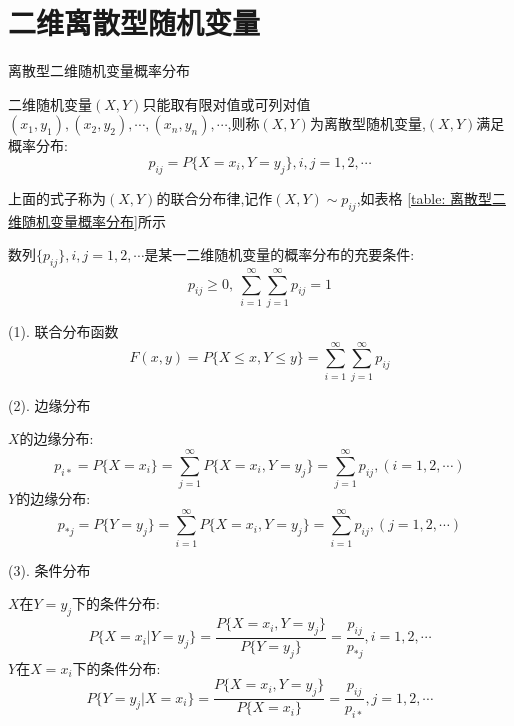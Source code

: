 \section{二维离散型随机变量}
\begin{table}[ht]
	\centering
	\caption{离散型二维随机变量概率分布}
	\label{table: 离散型二维随机变量概率分布}
\end{table}
\begin{definition}[二维离散型随机变量]
	
	二维随机变量$(X,Y)$只能取有限对值或可列对值$(x_{1},y_{1}),(x_{2},y_{2}),\cdots,(x_{n},y_{n}),\cdots$,则称$(X,Y)$为离散型随机变量,$(X,Y)$满足概率分布: 
	$$p_{ij}=P\{X=x_{i},Y=y_{j}\},i,j=1,2,\cdots$$
	
	上面的式子称为$(X,Y)$的联合分布律,记作$(X,Y)\sim p_{ij}$,如表格 \ref{table: 离散型二维随机变量概率分布}所示
	
	$\text{数列}\{p_{ij}\},i,j=1,2,\cdots\text{是某一二维随机变量的概率分布的充要条件: }$
	$$ p_{ij}\geq 0,\ \sum\limits_{i=1}^{\infty}\sum\limits_{j=1}^{\infty}p_{ij}=1$$
	
	
	(1). 联合分布函数
	$$F(x,y)=P\{X\leq x,Y\leq y\}=\sum\limits_{i=1}^{\infty}\sum\limits_{j=1}^{\infty}p_{ij}$$
	
	(2). 边缘分布
	
	$X$的边缘分布: 
	$$p_{i*}=P\{X=x_{i}\}=\sum\limits_{j=1}^{\infty}P\{X=x_{i},Y=y_{j}\}=\sum\limits_{j=1}^{\infty}p_{ij},(i=1,2,\cdots)$$
	$Y$的边缘分布: 
	$$p_{*j}=P\{Y=y_{j}\}=\sum\limits_{i=1}^{\infty}P\{X=x_{i},Y=y_{j}\}=\sum\limits_{i=1}^{\infty}p_{ij},(j=1,2,\cdots)$$
	
	(3). 条件分布
	
	$X$在$Y=y_{j}$下的条件分布: 
	$$P\{X=x_{i}|Y=y_{j}\}=\dfrac{P\{X=x_{i},Y=y_{j}\}}{P\{Y=y_{j}\}}=\dfrac{p_{ij}}{p_{*j}},i=1,2,\cdots$$
	$Y$在$X=x_{i}$下的条件分布: 
	$$P\{Y=y_{j}|X=x_{i}\}=\dfrac{P\{X=x_{i},Y=y_{j}\}}{P\{X=x_{i}\}}=\dfrac{p_{ij}}{p_{i*}},j=1,2,\cdots$$
\end{definition}
